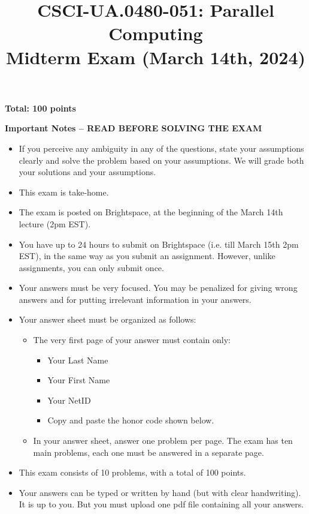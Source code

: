 \documentclass{article}
\begin{document}
\title{CSCI-UA.0480-051: Parallel Computing \\ Midterm Exam (March 14th, 2024)}
\author{}
\date{}
\maketitle

\textbf{Total: 100 points}

\textbf{Important Notes -- READ BEFORE SOLVING THE EXAM}

\begin{itemize}
    \item If you perceive any ambiguity in any of the questions, state your assumptions clearly and solve the problem based on your assumptions. We will grade both your solutions and your assumptions.
    \item This exam is take-home.
    \item The exam is posted on Brightspace, at the beginning of the March 14th lecture (2pm EST).
    \item You have up to 24 hours to submit on Brightspace (i.e. till March 15th 2pm EST), in the same way as you submit an assignment. However, unlike assignments, you can only submit once.
    \item Your answers must be very focused. You may be penalized for giving wrong answers and for putting irrelevant information in your answers.
    \item Your answer sheet must be organized as follows:
    \begin{itemize}
        \item The very first page of your answer must contain only:
        \begin{itemize}
            \item Your Last Name
            \item Your First Name
            \item Your NetID
            \item Copy and paste the honor code shown below.
        \end{itemize}
        \item In your answer sheet, answer one problem per page. The exam has ten main problems, each one must be answered in a separate page.
    \end{itemize}
    \item This exam consists of 10 problems, with a total of 100 points.
    \item Your answers can be typed or written by hand (but with clear handwriting). It is up to you. But you must upload one pdf file containing all your answers.
\end{itemize}
\end{document}
